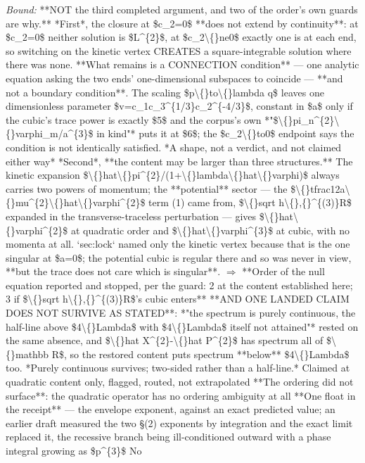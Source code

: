 \begin{description}
 \emph{Bound:}  **NOT the third completed argument, and two of the order's own guards are why.** *First*, the closure at \$c\_2=0\$ **does not extend by continuity**: at \$c\_2=0\$ neither solution is \$L\textasciicircum{}\{2\}\$, at \$c\_2\textbackslash\{\}ne0\$ exactly one is at each end, so switching on the kinetic vertex CREATES a square-integrable solution where there was none. **What remains is a CONNECTION condition** --- one analytic equation asking the two ends' one-dimensional subspaces to coincide --- **and not a boundary condition**. The scaling \$p\textbackslash\{\}to\textbackslash\{\}lambda q\$ leaves one dimensionless parameter \$v=c\_1c\_3\textasciicircum{}\{1/3\}c\_2\textasciicircum{}\{-4/3\}\$, constant in \$a\$ only if the cubic's trace power is exactly \$5\$ and the corpus's own *"\$\textbackslash\{\}pi\_n\textasciicircum{}\{2\}\textbackslash\{\}varphi\_m/a\textasciicircum{}\{3\}\$ in kind"* puts it at \$6\$; the \$c\_2\textbackslash\{\}to0\$ endpoint says the condition is not identically satisfied. *A shape, not a verdict, and not claimed either way*  *Second*, **the content may be larger than three structures.** The kinetic expansion \$\textbackslash\{\}hat\textbackslash\{\}pi\textasciicircum{}\{2\}/(1+\textbackslash\{\}lambda\textbackslash\{\}hat\textbackslash\{\}varphi)\$ always carries two powers of momentum; the **potential** sector --- the \$\textbackslash\{\}tfrac12a\textbackslash\{\}mu\textasciicircum{}\{2\}\textbackslash\{\}hat\textbackslash\{\}varphi\textasciicircum{}\{2\}\$ term (1) came from, \$\textbackslash\{\}sqrt h\textbackslash\{\},\{\}\textasciicircum{}\{(3)\}R\$ expanded in the transverse-traceless perturbation --- gives \$\textbackslash\{\}hat\textbackslash\{\}varphi\textasciicircum{}\{2\}\$ at quadratic order and \$\textbackslash\{\}hat\textbackslash\{\}varphi\textasciicircum{}\{3\}\$ at cubic, with no momenta at all. `sec:lock` named only the kinetic vertex because that is the one singular at \$a=0\$; the potential cubic is regular there and so was never in view, **but the trace does not care which is singular**. \ensuremath{\Rightarrow} **Order of the null equation reported and stopped, per the guard: 2 at the content established here; 3 if \$\textbackslash\{\}sqrt h\textbackslash\{\},\{\}\textasciicircum{}\{(3)\}R\$'s cubic enters**  **AND ONE LANDED CLAIM DOES NOT SURVIVE AS STATED**: *"the spectrum is purely continuous, the half-line above \$4\textbackslash\{\}Lambda\$ with \$4\textbackslash\{\}Lambda\$ itself not attained"* rested on the same absence, and \$\textbackslash\{\}hat X\textasciicircum{}\{2\}-\textbackslash\{\}hat P\textasciicircum{}\{2\}\$ has spectrum all of \$\textbackslash\{\}mathbb R\$, so the restored content puts spectrum **below** \$4\textbackslash\{\}Lambda\$ too. *Purely continuous survives; two-sided rather than a half-line.* Claimed at quadratic content only, flagged, routed, not extrapolated  **The ordering did not surface**: the quadratic operator has no ordering ambiguity at all  **One float in the receipt** --- the envelope exponent, against an exact predicted value; an earlier draft measured the two \S{}(2) exponents by integration and the exact limit replaced it, the recessive branch being ill-conditioned outward with a phase integral growing as \$p\textasciicircum{}\{3\}\$  No 
\end{description}
